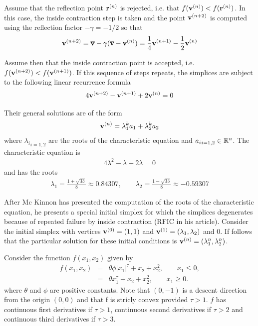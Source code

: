 Assume that the reflection point $\mathbf{r}^{(n)}$ is rejected, i.e. that 
$f(\mathbf{v}^{(n)}) < f(\mathbf{r}^{(n)})$. In this case, the inside contraction 
step is taken and the point $\mathbf{v}^{(n+2)}$ is computed using the 
reflection factor $-\gamma = -1/2$ so that 
\begin{eqnarray}
\label{mckinnon-insidecontraction}
\mathbf{v}^{(n+2)} = \overline{\mathbf{v}} - 
\gamma ( \overline{\mathbf{v}} - \mathbf{v}^{(n)} ) 
= \frac{1}{4} \mathbf{v}^{(n+1)} - \frac{1}{2} \mathbf{v}^{(n)}
\end{eqnarray}

Assume then that the inside contraction point is accepted, i.e. $f(\mathbf{v}^{(n+2)}) < f(\mathbf{v}^{(n+1)})$.
If this sequence of steps repeats, the simplices are subject to the 
following linear recurrence formula
\begin{eqnarray}
\label{mckinnon-reccurence}
4 \mathbf{v}^{(n+2)} - \mathbf{v}^{(n+1)} + 2 \mathbf{v}^{(n)} = 0
\end{eqnarray}

Their general solutions are of the form 
\begin{eqnarray}
\mathbf{v}^{(n)} = \lambda_1^k a_1 + \lambda_2^k a_2
\end{eqnarray}
where ${\lambda_i}_{i=1,2}$ are the roots of the characteristic equation and 
${a_i}_{i=1,2} \in \mathbb{R}^n$. 
The characteristic equation is 
\begin{eqnarray}
\label{mckinnon-caracequation}
4 \lambda^2 - \lambda + 2 \lambda = 0
\end{eqnarray}
and has the roots 
\begin{eqnarray}
\label{mckinnon-roots}
\lambda_1 = \frac{1 + \sqrt{33}}{8}\approx 0.84307, 
\qquad \lambda_2 = \frac{1 - \sqrt{33}}{8} \approx -0.59307
\end{eqnarray}

After Mc Kinnon has presented the computation of the roots of the 
characteristic equation, he presents a special initial simplex 
for which the simplices degenerates because of repeated failure by inside 
contraction (RFIC in his article). Consider the initial simplex with
vertices $\mathbf{v}^{(0)} = (1,1)$ and $\mathbf{v}^{(1)} = (\lambda_1,\lambda_2)$ and 
$0$. If follows that the particular solution for these initial 
conditions is $\mathbf{v}^{(n)} = (\lambda_1^n,\lambda_2^n)$.

Consider the function $f(x_1,x_2)$ given by 
\begin{eqnarray}
\label{mckinnon-function}
f(x_1,x_2) &=& \theta \phi |x_1|^\tau + x_2 + x_2^2, \qquad x_1\leq 0,\\
&=&\theta x_1^\tau + x_2 + x_2^2, \qquad x_1\geq 0.
\end{eqnarray}
where $\theta$ and $\phi$ are positive constants. Note that $(0,-1)$
is a descent direction from the origin $(0,0)$ and that f is stricly convex 
provided $\tau>1$. $f$ has continuous first derivatives if $\tau>1$, continuous second 
derivatives if $\tau>2$ and continuous third derivatives if $\tau>3$.

